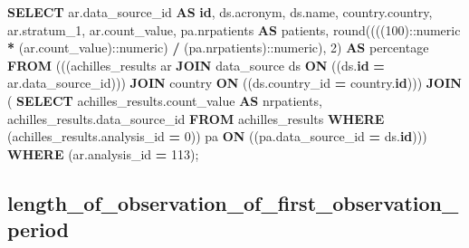 \documentclass[
]{book}
\newenvironment{Shaded}{\begin{snugshade}}{\end{snugshade}}
\newcommand{\CharTok}[1]{\textcolor[rgb]{0.31,0.60,0.02}{#1}}
\newcommand{\DecValTok}[1]{\textcolor[rgb]{0.00,0.00,0.81}{#1}}
\newcommand{\FunctionTok}[1]{\textcolor[rgb]{0.00,0.00,0.00}{#1}}
\newcommand{\KeywordTok}[1]{\textcolor[rgb]{0.13,0.29,0.53}{\textbf{#1}}}
\newcommand{\NormalTok}[1]{#1}
\newcommand{\OperatorTok}[1]{\textcolor[rgb]{0.81,0.36,0.00}{\textbf{#1}}}
\begin{document}
\begin{Shaded}
\begin{Highlighting}[]
\KeywordTok{SELECT}\NormalTok{ ar.data\_source\_id }\KeywordTok{AS} \KeywordTok{id}\NormalTok{,}
\NormalTok{   ds.acronym,}
\NormalTok{   ds.name,}
\NormalTok{   country.country,}
\NormalTok{   ar.stratum\_1,}
\NormalTok{   ar.count\_value,}
\NormalTok{   pa.nrpatients }\KeywordTok{AS}\NormalTok{ patients,}
   \FunctionTok{round}\NormalTok{((((}\DecValTok{100}\NormalTok{):}\CharTok{:numeric} \OperatorTok{*}\NormalTok{ (ar.count\_value):}\CharTok{:numeric}\NormalTok{) }\OperatorTok{/}\NormalTok{ (pa.nrpatients):}\CharTok{:numeric}\NormalTok{), }\DecValTok{2}\NormalTok{) }\KeywordTok{AS}\NormalTok{ percentage}
  \KeywordTok{FROM}\NormalTok{ (((achilles\_results ar}
    \KeywordTok{JOIN}\NormalTok{ data\_source ds }\KeywordTok{ON}\NormalTok{ ((ds.}\KeywordTok{id} \OperatorTok{=}\NormalTok{ ar.data\_source\_id)))}
    \KeywordTok{JOIN}\NormalTok{ country }\KeywordTok{ON}\NormalTok{ ((ds.country\_id }\OperatorTok{=}\NormalTok{ country.}\KeywordTok{id}\NormalTok{)))}
    \KeywordTok{JOIN}\NormalTok{ ( }\KeywordTok{SELECT}\NormalTok{ achilles\_results.count\_value }\KeywordTok{AS}\NormalTok{ nrpatients,}
\NormalTok{           achilles\_results.data\_source\_id}
          \KeywordTok{FROM}\NormalTok{ achilles\_results}
         \KeywordTok{WHERE}\NormalTok{ (achilles\_results.analysis\_id }\OperatorTok{=} \DecValTok{0}\NormalTok{)) pa }\KeywordTok{ON}\NormalTok{ ((pa.data\_source\_id }\OperatorTok{=}\NormalTok{ ds.}\KeywordTok{id}\NormalTok{)))}
 \KeywordTok{WHERE}\NormalTok{ (ar.analysis\_id }\OperatorTok{=} \DecValTok{113}\NormalTok{);}
\end{Highlighting}
\end{Shaded}

\hypertarget{length_of_observation_of_first_observation_period}{%
\subsection*{length\_of\_observation\_of\_first\_observation\_period}\label{length_of_observation_of_first_observation_period}}
\end{document}
